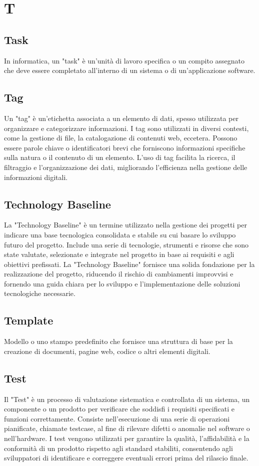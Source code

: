 \documentclass{article}
\begin{document}
\section{T}
\subsection{Task}
In informatica, un "task" è un'unità di lavoro specifica o un compito assegnato che deve essere completato all'interno di un sistema o di un'applicazione software.

\subsection{Tag}
Un "tag" è un'etichetta associata a un elemento di dati, spesso utilizzata per organizzare e categorizzare informazioni. I tag sono utilizzati in diversi contesti, come la gestione di file, la catalogazione di contenuti web, eccetera. Possono essere parole chiave o identificatori brevi che forniscono informazioni specifiche sulla natura o il contenuto di un elemento. L'uso di tag facilita la ricerca, il filtraggio e l'organizzazione dei dati, migliorando l'efficienza nella gestione delle informazioni digitali.

\subsection{Technology Baseline}
La "Technology Baseline" è un termine utilizzato nella gestione dei progetti per indicare una base tecnologica consolidata e stabile su cui basare lo sviluppo futuro del progetto. Include una serie di tecnologie, strumenti e risorse che sono state valutate, selezionate e integrate nel progetto in base ai requisiti e agli obiettivi prefissati. La "Technology Baseline" fornisce una solida fondazione per la realizzazione del progetto, riducendo il rischio di cambiamenti improvvisi e fornendo una guida chiara per lo sviluppo e l'implementazione delle soluzioni tecnologiche necessarie.

\subsection{Template}
Modello o uno stampo predefinito che fornisce una struttura di base per la creazione di documenti, pagine web, codice o altri elementi digitali.

\subsection{Test}
Il "Test" è un processo di valutazione sistematica e controllata di un sistema, un componente o un prodotto per verificare che soddisfi i requisiti specificati e funzioni correttamente. Consiste nell'esecuzione di una serie di operazioni pianificate, chiamate testcase, al fine di rilevare difetti o anomalie nel software o nell'hardware. I test vengono utilizzati per garantire la qualità, l'affidabilità e la conformità di un prodotto rispetto agli standard stabiliti, consentendo agli sviluppatori di identificare e correggere eventuali errori prima del rilascio finale.
\end{document}
